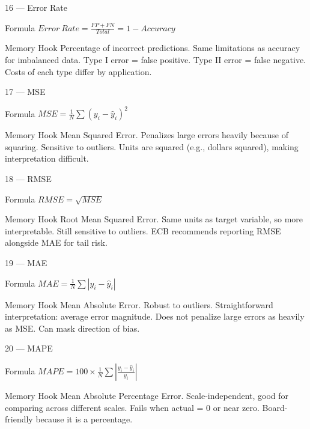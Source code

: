 \documentclass[aspectratio=169,8pt]{beamer}
\begin{document}
	\begin{frame}{16 --- Error Rate}
		\begin{block}{Formula}
			$Error\ Rate = \frac{FP + FN}{Total} = 1 - Accuracy$
		\end{block}
		\begin{block}{Memory Hook}
			Percentage of incorrect predictions. Same limitations as accuracy for imbalanced data. Type I error = false positive. Type II error = false negative. Costs of each type differ by application.
		\end{block}
	\end{frame}
	
	\begin{frame}{17 --- MSE}
		\begin{block}{Formula}
			$MSE = \frac{1}{N}\sum(y_i - \hat{y}_i)^2$
		\end{block}
		\begin{block}{Memory Hook}
			Mean Squared Error. Penalizes large errors heavily because of squaring. Sensitive to outliers. Units are squared (e.g., dollars squared), making interpretation difficult.
		\end{block}
	\end{frame}
	
	\begin{frame}{18 --- RMSE}
		\begin{block}{Formula}
			$RMSE = \sqrt{MSE}$
		\end{block}
		\begin{block}{Memory Hook}
			Root Mean Squared Error. Same units as target variable, so more interpretable. Still sensitive to outliers. ECB recommends reporting RMSE alongside MAE for tail risk.
		\end{block}
	\end{frame}
	
	\begin{frame}{19 --- MAE}
		\begin{block}{Formula}
			$MAE = \frac{1}{N}\sum|y_i - \hat{y}_i|$
		\end{block}
		\begin{block}{Memory Hook}
			Mean Absolute Error. Robust to outliers. Straightforward interpretation: average error magnitude. Does not penalize large errors as heavily as MSE. Can mask direction of bias.
		\end{block}
	\end{frame}
	
	\begin{frame}{20 --- MAPE}
		\begin{block}{Formula}
			$MAPE = 100 \times \frac{1}{N}\sum\left|\frac{y_i - \hat{y}_i}{y_i}\right|$
		\end{block}
		\begin{block}{Memory Hook}
			Mean Absolute Percentage Error. Scale-independent, good for comparing across different scales. Fails when actual = 0 or near zero. Board-friendly because it is a percentage.
		\end{block}
	\end{frame}
	
\end{document}
